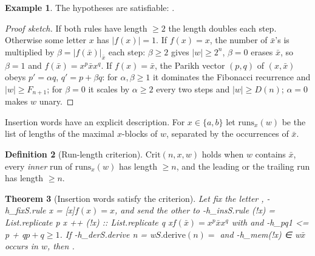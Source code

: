 \documentclass[11pt]{article}
\newtheorem{theorem}{Theorem}
\theoremstyle{definition}
\newtheorem{definition}[theorem]{Definition}
\newtheorem{example}[theorem]{Example}
\theoremstyle{remark}
\begin{document}
\begin{example}
The hypotheses are satisfiable:
.
\end{example}

\begin{proof}[Proof sketch]
If both rules have length $\ge2$ the length doubles each step. Otherwise some letter $x$ has
$|f(x)|=1$. If $f(x)=x$, the number of $\bar x$'s is multiplied by $\beta=|f(\bar x)|_{\bar x}$
each step: $\beta\ge2$ gives $|w|\ge2^n$, $\beta=0$ erases $\bar x$, so $\beta=1$ and $f(\bar x)=x^p\bar x x^q$.
If $f(x)=\bar x$, the Parikh vector $(p,q)$ of $(x,\bar x)$ obeys $p'=\alpha q$, $q'=p+\beta q$:
for $\alpha,\beta\ge1$ it dominates the Fibonacci recurrence and $|w|\ge F_{n+1}$; for $\beta=0$
it scales by $\alpha\ge2$ every two steps and $|w|\ge D(n)$; $\alpha=0$ makes $w$ unary.
\end{proof}

Insertion words have an explicit description. For $x\in\{a,b\}$ let $\mathrm{runs}_x(w)$ be the
list of lengths of the maximal $x$-blocks of $w$, separated by the occurrences of $\bar x$.

\begin{definition}[Run-length criterion]
$\mathrm{Crit}(n,x,w)$ holds when $w$ contains $\bar x$, every \emph{inner} run of
$\mathrm{runs}_x(w)$ has length $\ge n$, and the leading or the trailing run has length $\ge n$.
\end{definition}

\begin{theorem}[Insertion words satisfy the criterion]
Let  fix the letter , \hyp{h_fix}{S.rule x = [x]}{$f(x)=x$},
and send the other to \hyp{h_ins}{S.rule (!x) = List.replicate p x ++ (!x) :: List.replicate q x}{$f(\bar x)=x^p\bar x x^q$}
with  and \hyp{h_pq}{1 <= p + q}{$p+q\ge1$}. If
\hyp{h_der}{S.derive n = w}{$S.\mathrm{derive}(n)=$} and
\hyp{h_mem}{(!x) ∈ w}{$\bar x$ occurs in $w$}, then .
\end{theorem}
\end{document}
